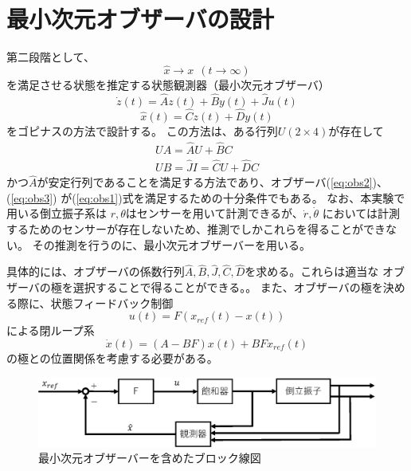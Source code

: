 \section{最小次元オブザーバの設計}
	第二段階として、
	\begin{equation}
		\hat{x}→x\ \ (t→\infty)
		\label{eq:obs1}
	\end{equation}
	を満足させる状態を推定する状態観測器（最小次元オブザーバ）
	\begin{equation}
		\dot{z}(t) = \hat{A}z(t)+\hat{B}y(t)+\hat{J}u(t)
		\label{eq:obs2}
	\end{equation}
	\begin{equation}
		\hat{x}(t) = \hat{C}z(t) + \hat{D}y(t)
		\label{eq:obs3}
	\end{equation}
	をゴピナスの方法で設計する。
	この方法は、ある行列$U(2×4)$が存在して
	\[
		\begin{array}{c}
			UA = \hat{A}U + \hat{B}C \\
			UB = \hat{J}
			I = \hat{C}U + \hat{D}C
		\end{array}
	\]
	かつ$\hat{A}$が安定行列であることを満足する方法であり、オブザーバ(\ref{eq:obs2})、(\ref{eq:obs3})
	が(\ref{eq:obs1})式を満足するための十分条件でもある。
	なお、本実験で用いる倒立振子系は
	$r,\theta$はセンサーを用いて計測できるが、$\dot{r},\dot{\theta}$
	においては計測するためのセンサーが存在しないため、推測でしかこれらを得ることができない。
	その推測を行うのに、最小次元オブザーバーを用いる。
	\par
	具体的には、オブザーバの係数行列$\hat{A},\hat{B},\hat{J},\hat{C},\hat{D}$を求める。これらは適当な
	オブザーバの極を選択することで得ることができる。。
	また、オブザーバの極を決める際に、状態フィードバック制御
	\[
		u(t) = F(x_{ref}(t)-x(t))
	\]
	による閉ループ系
	\[
		\dot{x}(t) = (A-BF)x(t) + BFx_{ref}(t)
	\]
	の極との位置関係を考慮する必要がある。
	\begin{figure}[h]
		\centering
		\includegraphics[width=0.8\linewidth]{gazo/controll_obs.eps}
		\caption{最小次元オブザーバーを含めたブロック線図}
		\label{image:cOBS}
	\end{figure}
